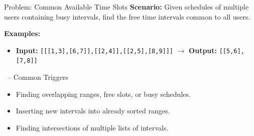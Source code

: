 \begin{frame}[fragile]{Problem: Common Available Time Slots}
  \textbf{Scenario:}
  Given schedules of multiple users containing busy intervals, find the free time intervals common to all users.
  
  \vspace{0.3cm}
  \textbf{Examples:}
  \begin{itemize}
    \item \textbf{Input:} \texttt{[[[1,3],[6,7]],[[2,4]],[[2,5],[8,9]]]} $\rightarrow$ \textbf{Output:} \texttt{[[5,6],[7,8]]}
  \end{itemize}
\end{frame}

\begin{frame}{\secname\ -- Common Triggers}
  \begin{itemize}
    \item Finding overlapping ranges, free slots, or busy schedules.
        \item Inserting new intervals into already sorted ranges.
        \item Finding intersections of multiple lists of intervals.
  \end{itemize}
\end{frame}

